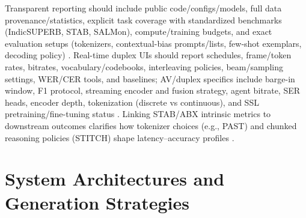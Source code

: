 \documentclass{article}
\begin{document}
Transparent reporting should include public code/configs/models, full data provenance/statistics, explicit task coverage with standardized benchmarks (IndicSUPERB, STAB, SALMon), compute/training budgets, and exact evaluation setups (tokenizers, contextual-bias prompts/lists, few-shot exemplars, decoding policy) \cite{vashishth2024stabspeechtokenizerassessmentbenchmark,entry2025indicsuperbspeechprocessinguniversalperf,maimon2025salmonsuiteacousticlanguagemodelevaluati,chen2023reducingbarriersselfsupervisedlearninghu,sun2023contextualbiasingnamedentitieslargelangu}. Real-time duplex UIs should report schedules, frame/token rates, bitrates, vocabulary/codebooks, interleaving policies, beam/sampling settings, WER/CER tools, and baselines; AV/duplex specifics include barge-in window, F1 protocol, streaming encoder and fusion strategy, agent bitrate, SER heads, encoder depth, tokenization (discrete vs continuous), and SSL pretraining/fine-tuning status \cite{yang2024buildingtaiwanesemandarinspokenlanguagem,wang2023slmbridgethingapbetweenspeechtextfoundat,maimon2025salmonsuiteacousticlanguagemodelevaluati,entry2025indicsuperbspeechprocessinguniversalperf,li2025continuousspeechtokenizertext,hu2025salmduplexefficientdirectmodelingspeechl,chen2023reducingbarriersselfsupervisedlearninghu}. Linking STAB/ABX intrinsic metrics to downstream outcomes clarifies how tokenizer choices (e.g., PAST) and chunked reasoning policies (STITCH) shape latency--accuracy profiles \cite{har-tuv2025pastphoneticacousticspeechtokenizer,fily2024establishingdegreesclosenessbetweenaudio,vashishth2024stabspeechtokenizerassessmentbenchmark,entry2025indicsuperbspeechprocessinguniversalperf,chiang2025stitchsimultaneousthinkingtalkingchunked}.

















\section{System Architectures and Generation Strategies} \label{sec:systemarchitecturesandgenerationstrategies}
\end{document}
